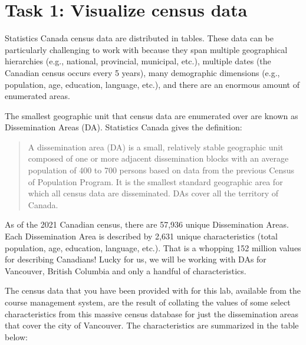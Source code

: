 \documentclass[
]{book}
\begin{document}
\hypertarget{task-1-visualize-census-data}{%
\section*{Task 1: Visualize census data}\label{task-1-visualize-census-data}}

Statistics Canada census data are distributed in tables. These data can be particularly challenging to work with because they span multiple geographical hierarchies (e.g., national, provincial, municipal, etc.), multiple dates (the Canadian census occurs every 5 years), many demographic dimensions (e.g., population, age, education, language, etc.), and there are an enormous amount of enumerated areas.

The smallest geographic unit that census data are enumerated over are known as Dissemination Areas (DA). Statistics Canada gives the definition:

\begin{quote}
A dissemination area (DA) is a small, relatively stable geographic unit composed of one or more adjacent dissemination blocks with an average population of 400 to 700 persons based on data from the previous Census of Population Program. It is the smallest standard geographic area for which all census data are disseminated. DAs cover all the territory of Canada.
\end{quote}

As of the 2021 Canadian census, there are 57,936 unique Dissemination Areas. Each Dissemination Area is described by 2,631 unique characteristics (total population, age, education, language, etc.). That is a whopping 152 million values for describing Canadians! Lucky for us, we will be working with DAs for Vancouver, British Columbia and only a handful of characteristics.

The census data that you have been provided with for this lab, available from the course management system, are the result of collating the values of some select characteristics from this massive census database for just the dissemination areas that cover the city of Vancouver. The characteristics are summarized in the table below:
\end{document}
